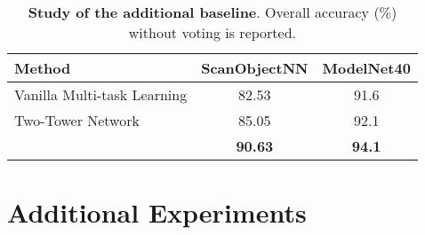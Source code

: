 \documentclass{article}
\theoremstyle{plain}
\theoremstyle{definition}
\theoremstyle{remark}
\def\recon{{\scshape ReCon}}
\begin{document}
\begin{table}[!h]
\vspace{-15pt}
\caption{\textbf{Study of the additional baseline}. Overall accuracy (\%) without voting is reported.} \label{tab:addition_baseline}
\begin{center}
\begin{tabular}{lcc}
\toprule[0.95pt]
Method & ScanObjectNN & ModelNet40\\
\midrule[0.6pt]
Vanilla Multi-task Learning & 82.53 & 91.6\\
Two-Tower Network & 85.05 & 92.1\\
\rowcolor{linecolor}\recon & \textbf{90.63} & \textbf{94.1}\\
\bottomrule[0.95pt]
\end{tabular}
\end{center}
\vspace{-20pt}
\end{table} 
\section{Additional Experiments}\label{app:add_exp}
\end{document}
